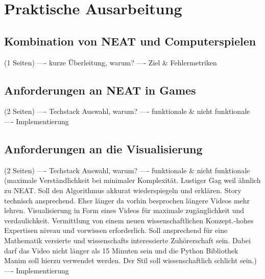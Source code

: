 \chapter{Praktische Ausarbeitung}
\label{chapter:3}
\section{Kombination von NEAT und Computerspielen}
(1 Seiten)
---- kurze Überleitung, warum?
---- Ziel \& Fehlermetriken

\section{Anforderungen an NEAT in Games}
(2 Seiten)
---- Techstack Auswahl, warum?
---- funktionale \& nicht funktionale
---- Implementierung  

\section{Anforderungen an die Visualisierung}
(2 Seiten)
---- Techstack Auswahl, warum?
---- funktionale \& nicht funktionale (maximale Verständlichkeit bei minimaler Komplexität. Lustiger Gag weil ähnlich zu NEAT. Soll den Algorithmus akkurat wiederspiegeln und erklären. Story technisch ansprechend. Eher länger da vorhin besprochen längere Videos mehr lehren. Visualisierung in Form eines Videos für maximale zugänglichkeit und verdaulichkeit. Vermittlung von einem neuen wissenschaftlichen Konzept.-hohes Expertisen niveau und vorwissen erforderlich. Soll ansprechend für eine Mathematik versierte und wissenschafts interessierte Zuhörerschaft sein. Dabei darf das Video nicht länger als 15 Minuten sein und die Python Bibliothek Manim soll hierzu verwendet werden. Der Stil soll wissenschaftlich schlicht sein.)
---- Implementierung 